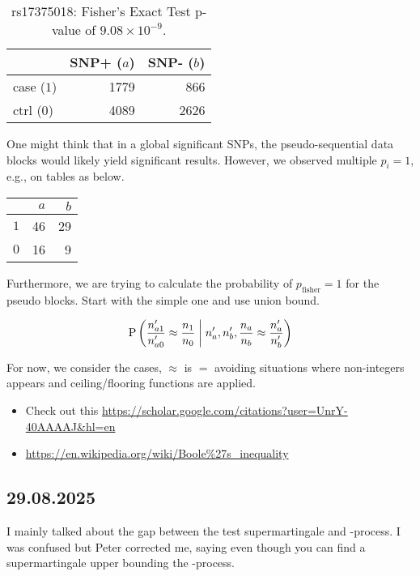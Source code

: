 \begin{table}[h]
\centering
\caption{rs17375018: Fisher's Exact Test p-value of $9.08 \times 10^{-9}$.}
\begin{tabular}{lrr}
\toprule
 & SNP+ ($a$) & SNP- ($b$)\\
\midrule
case ($1$) & 1779 & 866 \\
ctrl ($0$) & 4089 & 2626 \\
\bottomrule
\end{tabular}
\end{table}

One might think that in a global significant SNPs, the pseudo-sequential
data blocks would likely yield significant results. 
However, we observed multiple $p_i = 1$, e.g., on tables as below.
\begin{table}[h]
\centering
\begin{tabular}{lrr}
\toprule
 & $a$ & $b$\\
\midrule
$1$ & 46 & 29 \\
$0$ & 16 & 9 \\
\bottomrule
\end{tabular}
\end{table}

Furthermore, we are trying to calculate the probability of 
$p_{\mathrm{fisher}}=1$ for the pseudo blocks.
Start with the simple one and use union bound. 

\begin{align*}
	\condPR{\frac{n'_{a1}}{n'_{a0}} \approx \frac{n_1}{n_0}}{
	n'_a, n'_b, \frac{n_a}{n_b} \approx \frac{n_a'}{n_b'}
	} 
\end{align*}

For now, we consider the cases, $\approx$ is $=$ avoiding situations
where non-integers appears and ceiling/flooring functions are applied.

\begin{itemize}
	\item Check out this \url{https://scholar.google.com/citations?user=UnrY-40AAAAJ&hl=en}
	\item \url{https://en.wikipedia.org/wiki/Boole%27s_inequality}
\end{itemize}

\subsection*{29.08.2025}

I mainly talked about the gap between the test supermartingale and \E-process.
I was confused but Peter corrected me, saying even though you can find a 
supermartingale upper bounding the \E-process.

